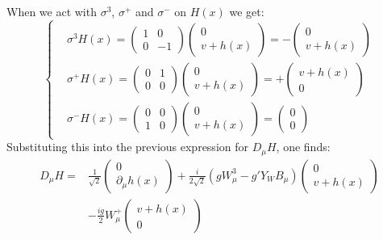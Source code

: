 \documentclass[../main.tex]{subfiles}
\begin{document}
When we act with $\sigma^3$, $\sigma^+$ and $\sigma^-$ on $H(x)$ we get:
\[
\left\{
\begin{aligned}
&\sigma^3H(x)=\left(\begin{array}{cc}
    1 & 0 \\
    0 & -1
\end{array}\right)\left(\begin{array}{c}
  0 \\
  v+h(x)
\end{array}\right)=-\left(\begin{array}{c}
  0 \\
  v+h(x)
\end{array}\right) \\
&\sigma^+H(x)=\left(\begin{array}{cc}
    0 & 1 \\
    0 & 0
\end{array}\right)\left(\begin{array}{c}
  0 \\
  v+h(x)
\end{array}\right)=+\left(\begin{array}{c}
  v+h(x) \\
  0
\end{array}\right) \\
&\sigma^-H(x)=\left(\begin{array}{cc}
    0 & 0 \\
    1 & 0
\end{array}\right)\left(\begin{array}{c}
  0 \\
  v+h(x)
\end{array}\right)=\left(\begin{array}{c}
  0 \\
  0
\end{array}\right)
\end{aligned}
\right.
\]
Substituting this into the previous expression for $D_\mu H$, one finds:
\begin{align*}
D_\mu H=&\frac{1}{\sqrt{2}}\begin{pmatrix}0 \\ \partial_\mu h(x)\end{pmatrix}+\frac{i}{2\sqrt{2}}(gW_\mu^3-g'Y_WB_\mu)\begin{pmatrix}0 \\ v+h(x)\end{pmatrix}\\
&-\frac{ig}{2}W_\mu^+\begin{pmatrix}v+h(x) \\ 0 \end{pmatrix}
\end{align*}
\end{document}
